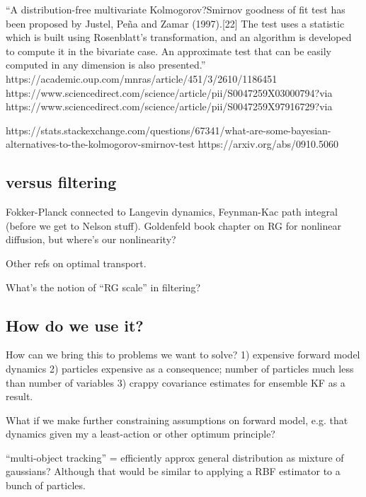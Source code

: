 \documentclass[notitlepage,openany,11pt]{report}
\theoremstyle{plain}%
\numberwithin{equation}{section}
\begin{document}
``A distribution-free multivariate Kolmogorov?Smirnov goodness of fit test has been proposed by Justel, Pe\~{n}a and Zamar (1997).[22] The test uses a statistic which is built using Rosenblatt's transformation, and an algorithm is developed to compute it in the bivariate case. An approximate test that can be easily computed in any dimension is also presented.''
https://academic.oup.com/mnras/article/451/3/2610/1186451
https://www.sciencedirect.com/science/article/pii/S0047259X03000794?via%
https://www.sciencedirect.com/science/article/pii/S0047259X97916729?via%

https://stats.stackexchange.com/questions/67341/what-are-some-bayesian-alternatives-to-the-kolmogorov-smirnov-test
https://arxiv.org/abs/0910.5060



\subsection{versus filtering}

Fokker-Planck connected to Langevin dynamics, Feynman-Kac path integral (before we get to Nelson stuff).
Goldenfeld book chapter on RG for nonlinear diffusion, but where's our nonlinearity?

Other refs on optimal transport.

What's the notion of ``RG scale'' in filtering?



\subsection{How do we use it?}
How can we bring this to problems we want to solve? 1) expensive forward model dynamics 2) particles expensive as a consequence; number of particles much less than number of variables 3) crappy covariance estimates for ensemble KF as a result.

What if we make further constraining assumptions on forward model, e.g. that dynamics given my a least-action or other optimum principle?

``multi-object tracking'' = efficiently approx general distribution as mixture of gaussians?
Although that would be similar to applying a RBF estimator to a bunch of particles.




\clearpage
{} %
\end{document}
